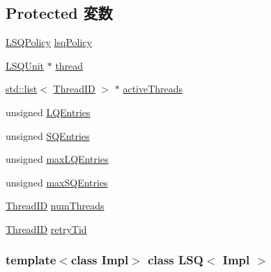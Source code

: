 \subsection*{Protected 変数}
\begin{DoxyCompactItemize}
\item 
\hyperlink{classLSQ_a2ecb54b28634ef872a820651cce92599}{LSQPolicy} \hyperlink{classLSQ_a28ca1f0961b84f3386b592d1e3e1b411}{lsqPolicy}
\item 
\hyperlink{classLSQUnit}{LSQUnit} $\ast$ \hyperlink{classLSQ_a5709dc03226b4fc5a49a4c6a41ff50ad}{thread}
\item 
\hyperlink{classstd_1_1list}{std::list}$<$ \hyperlink{base_2types_8hh_ab39b1a4f9dad884694c7a74ed69e6a6b}{ThreadID} $>$ $\ast$ \hyperlink{classLSQ_af6eaea53db532812052f71bf0380dab5}{activeThreads}
\item 
unsigned \hyperlink{classLSQ_aafa99d800d574095881acbacdbbbcc47}{LQEntries}
\item 
unsigned \hyperlink{classLSQ_a38c8af5392da70119dc5cce4e3637cbc}{SQEntries}
\item 
unsigned \hyperlink{classLSQ_ad2f4fd027fe71a87d5ee2d798ec19ac3}{maxLQEntries}
\item 
unsigned \hyperlink{classLSQ_a0e9eef7cd7598f554f1f89c35cb08128}{maxSQEntries}
\item 
\hyperlink{base_2types_8hh_ab39b1a4f9dad884694c7a74ed69e6a6b}{ThreadID} \hyperlink{classLSQ_a88377f855dbf5adeeecb06b5bb821d35}{numThreads}
\item 
\hyperlink{base_2types_8hh_ab39b1a4f9dad884694c7a74ed69e6a6b}{ThreadID} \hyperlink{classLSQ_a865aaad70625f17392c717930860d386}{retryTid}
\end{DoxyCompactItemize}
\subsubsection*{template$<$class Impl$>$ class LSQ$<$ Impl $>$}



